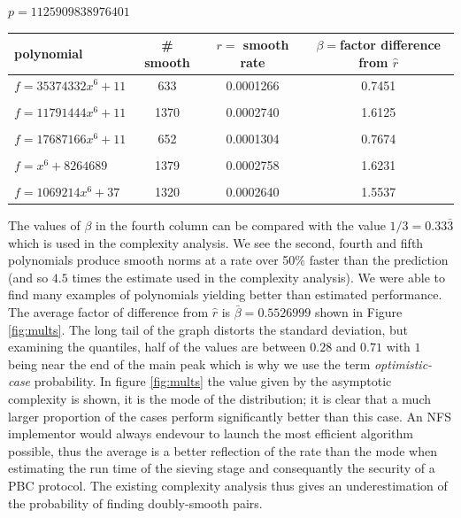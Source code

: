 \documentclass[a4paper, 12pt, envcountsect, runningheads]{llncs}
\numberwithin{figure}{section}
\numberwithin{equation}{section}
\begin{document}
$p=1125909838976401$
\begin{center}
\begin{tabular}{l|ccc}
polynomial & \# smooth & $r=$ smooth rate & $\beta=$factor difference from $\hat{r}$\\
\hline
$f=35374332x^6+11$ &633&0.0001266&0.7451\\
&&&\\
$f=11791444x^6+11$ &1370&0.0002740&1.6125\\
&&&\\
$f=17687166x^6+11$ &652&0.0001304&0.7674\\
&&&\\
$f=x^6+8264689$ &1379&0.0002758&1.6231\\
&&&\\
$f=1069214x^6+37$ &1320&0.0002640&1.5537
\end{tabular}
\end{center}
\vspace{0.5cm}
The values of $\beta$ in the fourth column can be compared with the value $1/3=0.33\bar{3}$ which is used in the complexity analysis. We see the second, fourth and fifth polynomials produce smooth norms at a rate over 50\% faster than the prediction (and so $4.5$ times the estimate used in the complexity analysis). We were able to find many examples of polynomials yielding better than estimated performance. The average factor of difference from $\hat{r}$ is $\bar{\beta}=0.5526999$ shown in Figure \ref{fig:mults}. The long tail of the graph distorts the standard deviation, but examining the quantiles, half of the values are between $0.28$ and $0.71$ with $1$ being near the end of the main peak which is why we use the term {\em optimistic-case} probability. In figure \ref{fig:mults} the value given by the asymptotic complexity is shown, it is the mode of the distribution; it is clear that a much larger proportion of the cases perform significantly better than this case. An NFS implementor would always endevour to launch the most efficient algorithm possible, thus the average is a better reflection of the rate than the mode when estimating the run time of the sieving stage and consequantly the security of a PBC protocol. The existing complexity analysis thus gives an underestimation of the probability of finding doubly-smooth pairs.
\end{document}
